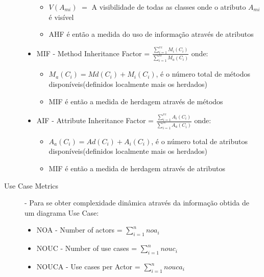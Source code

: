 \begin{description}
\begin{itemize}
\begin{itemize}
																				      \item $V(A_{mi})$ $=$ A visibilidade de todas as classes onde o atributo $A_{mi}$ é visível
																				      \item AHF é então a medida do uso de informação através de atributos
																				    \end{itemize}
				   \item MIF - Method Inheritance Factor = $ \frac{\sum_{i=1}^{rc} M_i(C_i)}{\sum_{i=1}^{rc} M_a(C_i)} $ onde: \begin{itemize}
				                                                                                                                \item $ M_a(C_i) = Md(C_i) + M_i(C_i)$, é o número total de métodos disponíveis(definidos localmente mais os herdados)
				                                                                                                                \item MIF é então a medida de herdagem através de métodos
				                                                                                                               \end{itemize}
				   \item AIF - Attribute Inheritance Factor = $ \frac{\sum_{i=1}^{rc} A_i(C_i)}{\sum_{i=1}^{rc} A_a(C_i)} $ onde: \begin{itemize}
				                                                                                                                \item $ A_a(C_i) = Ad(C_i) + A_i(C_i)$, é o número total de atributos disponíveis(definidos localmente mais os herdados)
				                                                                                                                \item MIF é então a medida de herdagem através de atributos
				                                                                                                               \end{itemize}

                                  \end{itemize}
 \item [Use Case Metrics] - Para se obter complexidade dinâmica através da informação obtida de um diagrama Use Case:\begin{itemize}
                             \item NOA - Number of actors = $ \sum_{i=1}^{n} noa_i $
                             \item NOUC - Number of use cases = $ \sum_{i=1}^{n} nouc_i $
                             \item NOUCA - Use cases per Actor = $ \sum_{i=1}^{n} nouca_i $
                            \end{itemize}
  
\end{description}